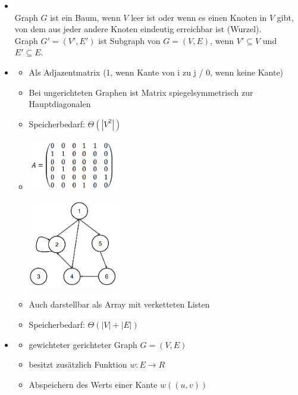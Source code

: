 \documentclass[
    12pt,
    a4paper,
    ngerman,
    color=3b,%
    marginpar=false,
    colorback=false,
    leqno,
]{tudaexercise}
\begin{document}
\begin{itemize}
        \item {} \\
            Graph $G$ ist ein Baum, wenn $V$ leer ist oder wenn es einen Knoten in $V$ gibt, \\
            von dem aus jeder andere Knoten eindeutig erreichbar ist (Wurzel). \\
            Graph $G'=(V',E')$ ist Subgraph von $G=(V,E)$, wenn $V'\subseteq V$ und $E' \subseteq E$.

        \item {}
            \begin{itemize}
                \item Als Adjazentmatrix (1, wenn Kante von i zu j / 0, wenn keine Kante)
                \item Bei ungerichteten Graphen ist Matrix spiegelsymmetrisch zur Hauptdiagonalen
                \item Speicherbedarf: $\Theta(|V^2|)$
                \item[]
                    \begin{minipage}{0.45\textwidth}
                        \includegraphics[width=4cm]{pictures/graph1.PNG}
                    \end{minipage}
                    \begin{minipage}{0.45\textwidth}
                        \includegraphics[width=4cm]{pictures/graph2.PNG}
                    \end{minipage}
                \item Auch darstellbar als Array mit verketteten Listen
                \item Speicherbedarf: $\Theta(|V| + |E|)$
            \end{itemize}

        \item {}
            \begin{itemize}
                \item gewichteter gerichteter Graph $G=(V,E)$
                \item besitzt zusätzlich Funktion $w: E \rightarrow R$
                \item Abspeichern des Werts einer Kante $w((u,v))$
            \end{itemize}
    \end{itemize}
\end{document}
